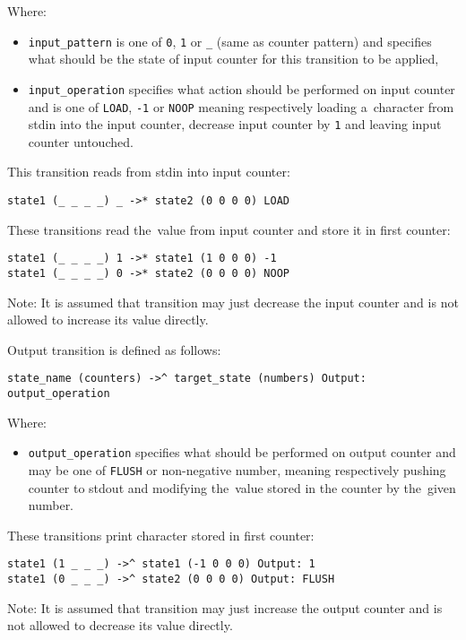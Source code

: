 \documentclass[english,shortabstract,mgr]{iithesis}
\begin{document}
Where:
\begin{itemize}
  \item \texttt{input\_pattern} is one of \texttt{0}, \texttt{1} or \texttt{\_}
      (same as counter pattern) and specifies what should be the state
      of input counter for this transition to be applied,
  \item \texttt{input\_operation} specifies what action should be performed
      on input counter and is one of \texttt{LOAD}, \texttt{-1} or \texttt{NOOP}
      meaning respectively loading a~character from stdin into the input counter,
      decrease input counter by \texttt{1} and leaving input counter untouched.
\end{itemize}

This transition reads from stdin into input counter:
\begin{verbatim}
state1 (_ _ _ _) _ ->* state2 (0 0 0 0) LOAD
\end{verbatim}

These transitions read the~value from input counter and store it in first counter:
\begin{verbatim}
state1 (_ _ _ _) 1 ->* state1 (1 0 0 0) -1
state1 (_ _ _ _) 0 ->* state2 (0 0 0 0) NOOP
\end{verbatim}

Note: It is assumed that transition may just decrease the input counter
and is not allowed to increase its value directly.

Output transition is defined as follows:
\begin{verbatim}
state_name (counters) ->^ target_state (numbers) Output: output_operation
\end{verbatim}

Where:
\begin{itemize}
  \item \texttt{output\_operation} specifies what should be performed
      on output counter and may be one of \texttt{FLUSH} or non-negative number,
      meaning respectively pushing counter to stdout and modifying
      the~value stored in the counter by the~given number.
\end{itemize}

These transitions print character stored in first counter:
\begin{verbatim}
state1 (1 _ _ _) ->^ state1 (-1 0 0 0) Output: 1
state1 (0 _ _ _) ->^ state2 (0 0 0 0) Output: FLUSH
\end{verbatim}

Note: It is assumed that transition may just increase the output counter
and is not allowed to decrease its value directly.
\end{document}
